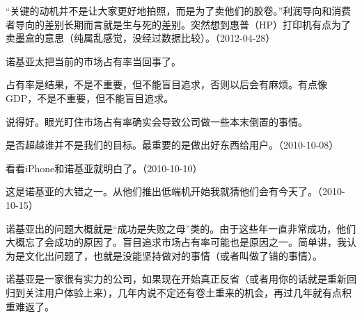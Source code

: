 “关键的动机并不是让大家更好地拍照，而是为了卖他们的胶卷。”利润导向和消费者导向的差别长期而言就是生与死的差别。突然想到惠普（HP）打印机有点为了卖墨盒的意思（纯属乱感觉，没经过数据比较）。（2012-04-28）



诺基亚太把当前的市场占有率当回事了。

占有率是结果，不是不重要，但不能盲目追求，否则以后会有麻烦。有点像GDP，不是不重要，但不能盲目追求。


说得好。眼光盯住市场占有率确实会导致公司做一些本末倒置的事情。


是否超越谁并不是我们的目标。最重要的是做出好东西给用户。（2010-10-08）


看看iPhone和诺基亚就明白了。（2010-10-10）


这是诺基亚的大错之一。从他们推出低端机开始我就猜他们会有今天了。（2010-10-15）


诺基亚出的问题大概就是“成功是失败之母”类的。由于这些年一直非常成功，他们大概忘了会成功的原因了。盲目追求市场占有率可能也是原因之一。简单讲，我认为是文化出问题了，也就是没能坚持做对的事情（或者叫做了错的事情）。

诺基亚是一家很有实力的公司，如果现在开始真正反省（或者用你的话就是重新回归到关注用户体验上来），几年内说不定还有卷土重来的机会，再过几年就有点积重难返了。

